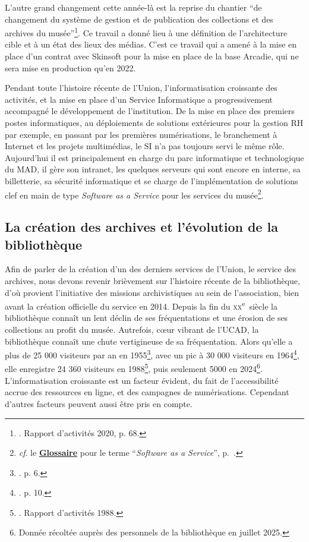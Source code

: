 L'autre grand changement cette année-là est la reprise du chantier \enquote{de changement du système de gestion et de publication des collections et des archives du musée}\footnote{\cite{noauthor__1982}. Rapport d'activités 2020, p. 68.}. Ce travail a donné lieu à une définition de l'architecture cible et à un état des lieux des médias. C'est ce travail qui a amené à la mise en place d'un contrat avec Skinsoft pour la mise en place de la base Arcadie, qui ne sera mise en production qu'en 2022.

Pendant toute l'histoire récente de l'Union, l'informatisation croissante des activités, et la mise en place d'un Service Informatique a progressivement accompagné le développement de l'institution. De la mise en place des premiers postes informatiques, au déploiements de solutions extérieures pour la gestion RH par exemple, en passant par les premières numérisations, le branchement à Internet et les projets multimédias, le SI n'a pas toujours servi le même rôle. Aujourd'hui il est principalement en charge du parc informatique et technologique du MAD, il gère son intranet, les quelques serveurs qui sont encore en interne, sa billetterie, sa sécurité informatique et se charge de l'implémentation de solutions clef en main de type \textit{Software as a Service} pour les services du musée\footnote{\textit{cf}. le \textbf{\hyperref[sec:Glossaire]{Glossaire}} pour le terme \enquote{\textit{Software as a Service}}, p.~\pageref{sec:Glossaire}.}. 

\subsection{La création des archives et l'évolution de la bibliothèque}

Afin de parler de la création d'un des derniers services de l'Union, le service des archives, nous devons revenir brièvement sur l'histoire récente de la bibliothèque, d'où provient l'initiative des missions archivistiques au sein de l'association, bien avant la création officielle du service en 2014. Depuis la fin du \textsc{xx}\textsuperscript{e}~siècle la bibliothèque connaît un lent déclin de ses fréquentations et une érosion de ses collections au profit du musée. Autrefois, cœur vibrant de l'UCAD, la bibliothèque connaît une chute vertigineuse de sa fréquentation. Alors qu'elle a plus de 25 000 visiteurs par an en 1955\footnote{\cite{noauthor__1955}. p. 6.}, avec un pic à 30 000 visiteurs en 1964\footnote{\cite{noauthor__1965}. p. 10.}, elle enregistre 24 360 visiteurs en 1988\footnote{\cite{noauthor__1982}. Rapport d'activités 1988.}, puis seulement 5000 en 2024\footnote{Donnée récoltée auprès des personnels de la bibliothèque en juillet 2025.}. L'informatisation croissante est un facteur évident, du fait de l'accessibilité accrue des ressources en ligne, et des campagnes de numérisations. Cependant d'autres facteurs peuvent aussi être pris en compte. 

